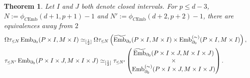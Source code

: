 \documentclass[a4paper, oneside]{amsart}
\newcommand{\emb}{\operatorname{Emb}}
\newcommand{\bemb}{\widetilde{\operatorname{Emb}}}
\newcommand{\cemb}{C\mathrm{Emb}}
\newcommand{\1}{\mathds{1}}
\newtheorem{thm}{Theorem}[section]%
\theoremstyle{remark}
\theoremstyle{definition}
\newcommand{\leqs}{\scaleobj{0.85}{\leq}}
\newcommand{\pemb}{\operatorname{Emb}^{(\sim)}}
\numberwithin{equation}{section}
\begin{document}







\begin{thm}\label{splittingthm}
Let $I$ and $J$ both denote closed intervals. For $p\leq d-3$, $N:=\phi_{\cemb}(d+1,p+1)-1$ and $N':=\phi_{\cemb}(d+2,p+2)-1$, there are equivalences away from $2$
\begin{align*}
&\Omega \tau_{\leqs N} \emb_{\partial_0}(P\times I, M\times I)\simeq_{[\frac{1}{2}]}\Omega\tau_{\leqs N}\left(\bemb_{\partial_0}(P\times I,M\times I)\times \pemb_{\partial_0}(P\times I,M\times I)\right),\\
&\tau_{\leqs N'} \emb_{\partial_0}(P\times I\times J, M\times I\times J)\simeq_{[\frac{1}{2}]}\tau_{\leqs N'}
\begin{pmatrix}
    \bemb_{\partial_0}(P\times I\times J,M\times I\times J)\\
    \times\\
    \pemb_{\partial_0}(P\times I\times J,M\times I\times J)
\end{pmatrix}.
\end{align*}
\end{thm}
\end{document}
